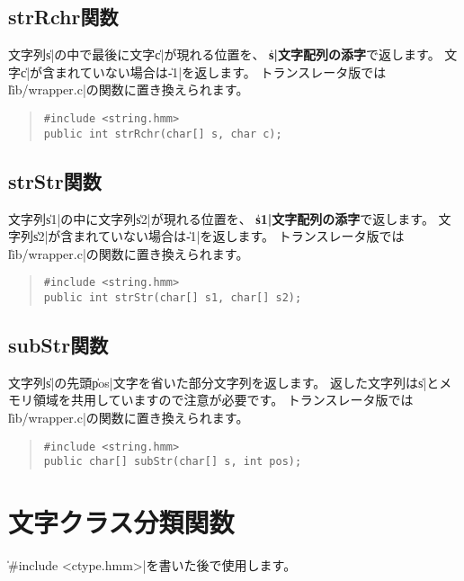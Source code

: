 \subsection{strRchr関数}

文字列\|s|の中で最後に文字\|c|が現れる位置を、
{\bf\|s|文字配列の添字}で返します。
文字\|c|が含まれていない場合は\|-1|を返します。
トランスレータ版では\|lib/wrapper.c|の関数に置き換えられます。

\begin{quote}
\begin{verbatim}
#include <string.hmm>
public int strRchr(char[] s, char c);
\end{verbatim}
\end{quote}

\subsection{strStr関数}

文字列\|s1|の中に文字列\|s2|が現れる位置を、
{\bf\|s1|文字配列の添字}で返します。
文字列\|s2|が含まれていない場合は\|-1|を返します。
トランスレータ版では\|lib/wrapper.c|の関数に置き換えられます。

\begin{quote}
\begin{verbatim}
#include <string.hmm>
public int strStr(char[] s1, char[] s2);
\end{verbatim}
\end{quote}

\subsection{subStr関数}

文字列\|s|の先頭\|pos|文字を省いた部分文字列を返します。
返した文字列は\|s|とメモリ領域を共用していますので注意が必要です。
トランスレータ版では\|lib/wrapper.c|の関数に置き換えられます。

\begin{quote}
\begin{verbatim}
#include <string.hmm>
public char[] subStr(char[] s, int pos);
\end{verbatim}
\end{quote}

\section{文字クラス分類関数}

\|#include <ctype.hmm>|を書いた後で使用します。

